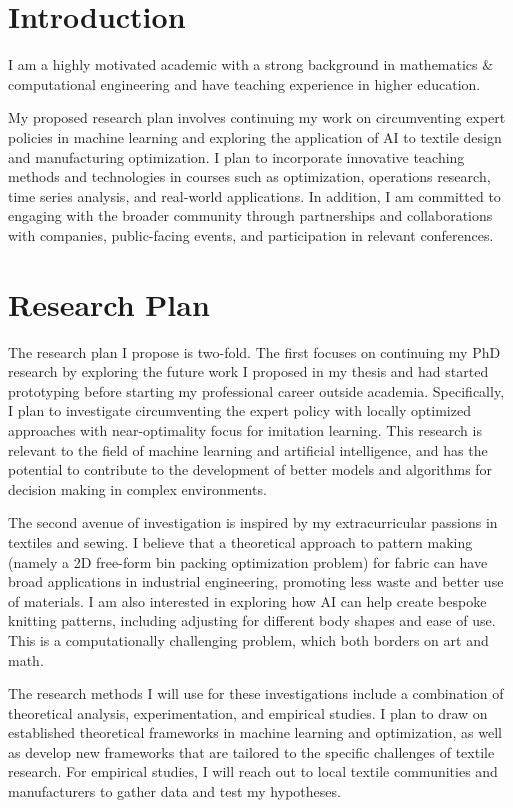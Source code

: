 \documentclass[]{cv} %
\begin{document}
	
\removeaside

\section{Introduction}
I am a highly motivated academic with a strong background in mathematics \& computational engineering and have teaching experience in higher education. 

My proposed research plan involves continuing my work on circumventing expert policies in machine learning and exploring the application of AI to textile design and manufacturing optimization. I plan to incorporate innovative teaching methods and technologies in courses such as optimization, operations research, time series analysis, and real-world applications. In addition, I am committed to engaging with the broader community through partnerships and collaborations with companies, public-facing events, and participation in relevant conferences.

\section{Research Plan}
The research plan I propose is two-fold. The first focuses on continuing my PhD research by exploring the future work I proposed in my thesis and had started prototyping before starting my professional career outside academia. Specifically, I plan to investigate circumventing the expert policy with locally optimized approaches with near-optimality focus for imitation learning. This research is relevant to the field of machine learning and artificial intelligence, and has the potential to contribute to the development of better models and algorithms for decision making in complex environments.

The second avenue of investigation is inspired by my extracurricular passions in textiles and sewing. I believe that a theoretical approach to pattern making (namely a 2D free-form bin packing optimization problem) for fabric can have broad applications in industrial engineering, promoting less waste and better use of materials. I am also interested in exploring how AI can help create bespoke knitting patterns, including adjusting for different body shapes and ease of use. This is a computationally challenging problem, which both borders on art and math. 

The research methods I will use for these investigations include a combination of theoretical analysis, experimentation, and empirical studies. I plan to draw on established theoretical frameworks in machine learning and optimization, as well as develop new frameworks that are tailored to the specific challenges of textile research. For empirical studies, I will reach out to local textile communities and manufacturers to gather data and test my hypotheses.
\end{document}
